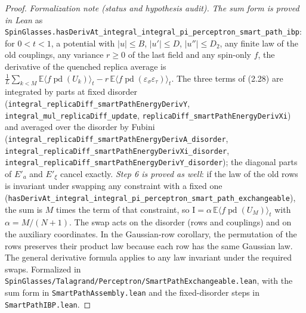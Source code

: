 \begin{proof}
\emph{Formalization note (status and hypothesis audit).} \emph{The sum form is proved in Lean} as
\texttt{SpinGlasses.hasDerivAt\_integral\_integral\_pi\_perceptron\_smart\_path\_ibp}: for $0<t<1$, a potential with
$|u|\le B$, $|u'|\le D$, $|u''|\le D_2$, any finite law of the old couplings, any variance $r\ge0$ of the last field and any
spin-only $f$, the derivative of the quenched replica average is $\frac1L\sum_{k<M}\mathbb E\langle f\operatorname{pd}(U_k)\rangle_t
-r\,\mathbb E\langle f\operatorname{pd}(\varepsilon_\sigma\varepsilon_\tau)\rangle_t$. The three terms of (2.28) are integrated by parts
at fixed disorder (\texttt{integral\_replicaDiff\_smartPathEnergyDerivY}, \texttt{integral\_mul\_replicaDiff\_update},
\texttt{replicaDiff\_smartPathEnergyDerivXi}) and averaged over the disorder by Fubini
(\texttt{integral\_replicaDiff\_smartPathEnergyDerivA\_disorder}, \texttt{integral\_replicaDiff\_smartPathEnergyDerivXi\_disorder},
\texttt{integral\_replicaDiff\_smartPathEnergyDerivY\_disorder}); the diagonal parts of $E'_a$ and $E'_\xi$ cancel exactly.
\emph{Step 6 is proved as well}: if the law of the old rows is invariant under swapping any constraint with a fixed one
(\texttt{hasDerivAt\_integral\_integral\_pi\_perceptron\_smart\_path\_exchangeable}), the sum is $M$ times the term of that constraint, so
$\mathrm I=\alpha\,\mathbb E\langle f\operatorname{pd}(U_{M})\rangle_t$ with $\alpha=M/(N+1)$. The swap acts on the disorder (rows and couplings)
and on the auxiliary coordinates. In the Gaussian-row corollary, the permutation of the rows
preserves their product law because each row has the same Gaussian law. The general derivative
formula applies to any law invariant under the required swaps. Formalized in \texttt{SpinGlasses/Talagrand/Perceptron/SmartPathExchangeable.lean}, with the sum form in \texttt{SmartPathAssembly.lean} and the fixed-disorder
steps in \texttt{SmartPathIBP.lean}.
\end{proof}


